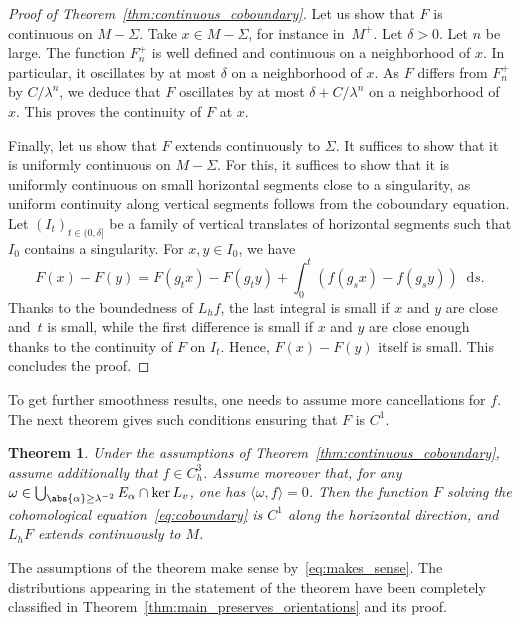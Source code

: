 \documentclass[JEP,XML,SOM,Unicode]{cedram}
\newcommand{\dd}{\mathop{}\!\mathrm{d}}
\newtheorem{thm}{Theorem}[section]
\theoremstyle{definition}
\numberwithin{equation}{section}
\begin{document}
\begin{proof}[Proof of Theorem~\ref{thm:continuous_coboundary}]
Let us show that $F$ is continuous on $M-\Sigma$. Take $x \in M-\Sigma$, for
instance in~$M^+$. Let $\delta>0$. Let $n$ be large. The function $F_n^+$ is
well defined and continuous on a neighborhood of $x$. In particular, it
oscillates by at most $\delta$ on a neighborhood of $x$. As $F$ differs from
$F_n^+$ by $C/\lambda^n$, we deduce that $F$ oscillates by at most
$\delta+C/\lambda^n$ on a neighborhood of $x$. This proves the continuity of
$F$ at $x$.

Finally, let us show that $F$ extends continuously to $\Sigma$. It suffices
to show that it is uniformly continuous on $M-\Sigma$. For this, it suffices
to show that it is uniformly continuous on small horizontal segments close to
a singularity, as uniform continuity along vertical segments follows from the
coboundary equation. Let $(I_t)_{t\in (0,\delta]}$ be a family of vertical
translates of horizontal segments such that $I_0$ contains a singularity. For
$x, y\in I_0$, we have
\[
F(x) - F(y) = F(g_t x)-F(g_t y) + \int_0^t (f(g_s x)
- f(g_s y)) \dd s.
\]
Thanks to the boundedness of $L_h f$, the last integral
is small if $x$ and $y$ are close and~$t$ is small, while the first
difference is small if $x$ and $y$ are close enough thanks to the continuity
of $F$ on $I_t$. Hence, $F(x)-F(y)$ itself is small. This concludes the
proof.
\end{proof}

To get further smoothness results, one needs to assume more cancellations for
$f$. The next theorem gives such conditions ensuring that $F$ is $C^1$.
\begin{thm}
\label{thm:C1_coboundary} Under the assumptions of
Theorem~\ref{thm:continuous_coboundary}, assume additionally that \hbox{$f \in
C^3_h$}. Assume moreover that, for any $\omega \in \bigcup_{\abs{\alpha} \geq
\lambda^{-2}} E_\alpha \cap \ker L_v$, one has $\langle \omega, f \rangle =
0$. Then the function $F$ solving the cohomological
equation~\eqref{eq:coboundary} is $C^1$ along the horizontal direction, and
$L_h F$ extends continuously to $M$.
\end{thm}
The assumptions of the theorem make sense by~\eqref{eq:makes_sense}. The
distributions appearing in the statement of the theorem have been completely
classified in Theorem~\ref{thm:main_preserves_orientations} and its proof.
\end{document}
